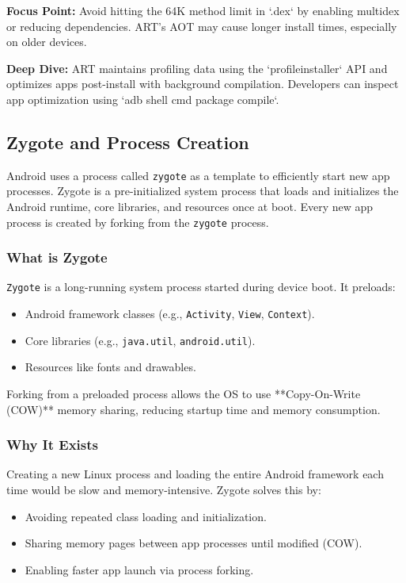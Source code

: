 \documentclass[a4paper,12pt]{article}
\begin{document}
\textbf{Focus Point:} Avoid hitting the 64K method limit in `.dex` by enabling multidex or reducing dependencies. ART's AOT may cause longer install times, especially on older devices.

\textbf{Deep Dive:} ART maintains profiling data using the `profileinstaller` API and optimizes apps post-install with background compilation. Developers can inspect app optimization using `adb shell cmd package compile`.

\subsection{Zygote and Process Creation}

Android uses a process called \texttt{zygote} as a template to efficiently start new app processes. Zygote is a pre-initialized system process that loads and initializes the Android runtime, core libraries, and resources once at boot. Every new app process is created by forking from the \texttt{zygote} process.

\subsubsection{What is Zygote}

\texttt{Zygote} is a long-running system process started during device boot. It preloads:
\begin{itemize}
  \item Android framework classes (e.g., \texttt{Activity}, \texttt{View}, \texttt{Context}).
  \item Core libraries (e.g., \texttt{java.util}, \texttt{android.util}).
  \item Resources like fonts and drawables.
\end{itemize}

Forking from a preloaded process allows the OS to use **Copy-On-Write (COW)** memory sharing, reducing startup time and memory consumption.

\subsubsection{Why It Exists}

Creating a new Linux process and loading the entire Android framework each time would be slow and memory-intensive. Zygote solves this by:
\begin{itemize}
  \item Avoiding repeated class loading and initialization.
  \item Sharing memory pages between app processes until modified (COW).
  \item Enabling faster app launch via process forking.
\end{itemize}
\end{document}
